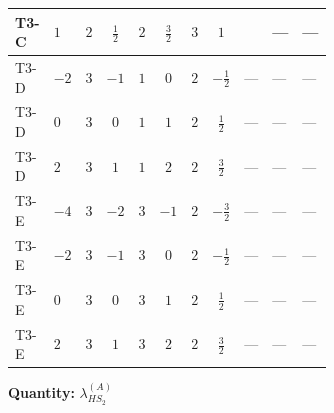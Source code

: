 \documentclass[8pt]{article}
\begin{document}
\begin{landscape}
\begin{longtable}{@{}llcccccc >{\raggedright\arraybackslash}p{0.21\linewidth} >{\raggedright\arraybackslash}p{0.21\linewidth} >{\raggedright\arraybackslash}p{0.21\linewidth}@{}}
\midrule
T3-C & $1$ & $2$ & $\frac{1}{2}$ & $2$ & $\frac{3}{2}$ & $3$ & $1$ & \scriptsize\adjustbox{max width=\linewidth}{$\begin{gathered} +{\lambda_{12}^{(A)}} {\lambda_{HS_1}^{(A)}}\end{gathered}$} & --- & --- \\
\midrule
T3-D & $-2$ & $3$ & $-1$ & $1$ & $0$ & $2$ & $-\frac{1}{2}$ & --- & --- & --- \\
\midrule
T3-D & $0$ & $3$ & $0$ & $1$ & $1$ & $2$ & $\frac{1}{2}$ & --- & --- & --- \\
\midrule
T3-D & $2$ & $3$ & $1$ & $1$ & $2$ & $2$ & $\frac{3}{2}$ & --- & --- & --- \\
\midrule
T3-E & $-4$ & $3$ & $-2$ & $3$ & $-1$ & $2$ & $-\frac{3}{2}$ & --- & --- & --- \\
\midrule
T3-E & $-2$ & $3$ & $-1$ & $3$ & $0$ & $2$ & $-\frac{1}{2}$ & --- & --- & --- \\
\midrule
T3-E & $0$ & $3$ & $0$ & $3$ & $1$ & $2$ & $\frac{1}{2}$ & --- & --- & --- \\
\midrule
T3-E & $2$ & $3$ & $1$ & $3$ & $2$ & $2$ & $\frac{3}{2}$ & --- & --- & --- \\
\midrule
\bottomrule
\end{longtable}
\clearpage
\noindent\textbf{Quantity: }$\lambda_{HS_2}^{(A)}$\par\smallskip

\end{landscape}
\end{document}
